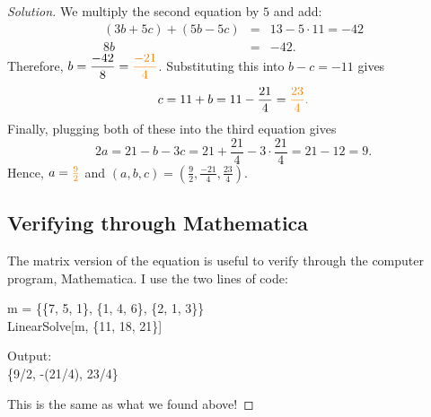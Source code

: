 \begin{proof}[Solution]
We multiply the second equation by $5$ and add: \begin{eqnarray*} \left(3b+5c\right)+\left(5b-5c\right)&=&13-5\cdot 11=-42 \\ 8b &=& -42. \end{eqnarray*}  Therefore, $\displaystyle b=\frac{-42}{8}=\color{orange} \frac{-21}{4}$. Substituting this into $b-c=-11$ gives $$c=11+b=11-\frac{21}{4}=\color{orange} \frac{23}{4}.$$ Finally, plugging both of these into the third equation gives $$2a=21-b-3c=21+\frac{21}{4}-3\cdot \frac{21}{4}=21-12=9.$$ Hence, $a=\color{orange} \frac92$ and $(a,b,c)=\boxed{(\frac{9}{2}, \frac{-21}{4}, \frac{23}{4})}.$ 

\clearpage

\subsection*{Verifying through Mathematica}

The matrix version of the equation is useful to verify through the computer program, Mathematica.  I use the two lines of code: 

\color{Lavender} m = \{\{7, 5, 1\}, \{1, 4, 6\}, \{2, 1, 3\}\} \\ LinearSolve[m, \{11, 18, 21\}]
\color{black} 

Output: \\ \color{ForestGreen} \{9/2, -(21/4), 23/4\}\color{black}
 
This is the same as what we found above!

\end{proof}

\clearpage


